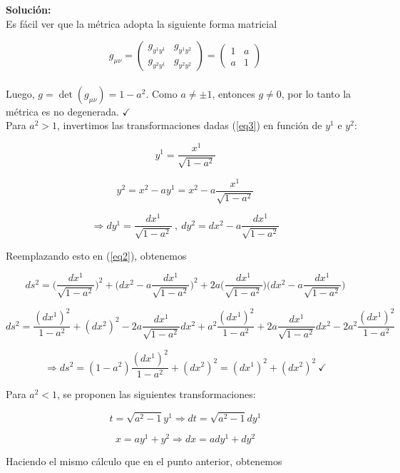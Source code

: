 \textbf{Soluci\'on:}\\

Es f\'acil ver que la m\'etrica adopta la siguiente forma matricial

$$g_{\mu \nu} =
    \begin{pmatrix}
    g_{y^{1}y^{1}} & g_{y^{1}y^{2}}\\
    g_{y^{2}y^{1}} & g_{y^{2}y^{2}}
    \end{pmatrix}
 = 
    \begin{pmatrix}
    1 & a\\
    a & 1
    \end{pmatrix}
$$\\

Luego, $g = \det(g_{\mu \nu}) = 1 - a^{2}$. Como $a \neq \pm 1$, entonces $g \neq 0$, por lo tanto la m\'etrica es no degenerada. $\checkmark$\\

Para $a^{2} > 1$, invertimos las transformaciones dadas (\ref{eq3}) en funci\'on de $y^{1}$ e $y^{2}$:

$$y^{1} = \frac{x^{1}}{\sqrt{1 - a^{2}}}$$

$$y^{2} = x^{2} - ay^{1} = x^{2} - a\frac{x^{1}}{\sqrt{1 - a^{2}}}$$

$$\Rightarrow dy^{1} = \frac{dx^{1}}{\sqrt{1 - a^{2}}} \ , \ dy^{2} = dx^{2} - a\frac{dx^{1}}{\sqrt{1 - a^{2}}}$$

Reemplazando esto en (\ref{eq2}), obtenemos

$$ds^{2} = \bigg(\frac{dx^{1}}{\sqrt{1 - a^{2}}}\bigg)^{2} + \bigg(dx^{2} - a\frac{dx^{1}}{\sqrt{1 - a^{2}}}\bigg)^{2} + 2a\bigg(\frac{dx^{1}}{\sqrt{1 - a^{2}}}\bigg)\bigg(dx^{2} - a\frac{dx^{1}}{\sqrt{1 - a^{2}}}\bigg)$$

$$ds^{2} = \frac{(dx^{1})^{2}}{1 - a^{2}} + (dx^{2})^{2} - 2a\frac{dx^{1}}{\sqrt{1 - a^{2}}}dx^{2} +  a^{2}\frac{(dx^{1})^{2}}{1 - a^{2}} + 2a\frac{dx^{1}}{\sqrt{1 - a^{2}}}dx^{2} - 2a^{2}\frac{(dx^{1})^{2}}{1 - a^{2}}$$

$$\Rightarrow ds^{2} = (1 - a^{2})\frac{(dx^{1})^{2}}{1 - a^{2}} + (dx^{2})^{2} = (dx^{1})^{2} + (dx^{2})^{2} \ \checkmark$$

Para $a^{2} < 1$, se proponen las siguientes transformaciones:

$$t = \sqrt{a^{2} - 1}y^{1} \Rightarrow dt = \sqrt{a^{2} - 1}dy^{1}$$

$$x = ay^{1} + y^{2} \Rightarrow dx = ady^{1} + dy^{2}$$

Haciendo el mismo c\'alculo que en el punto anterior, obtenemos

